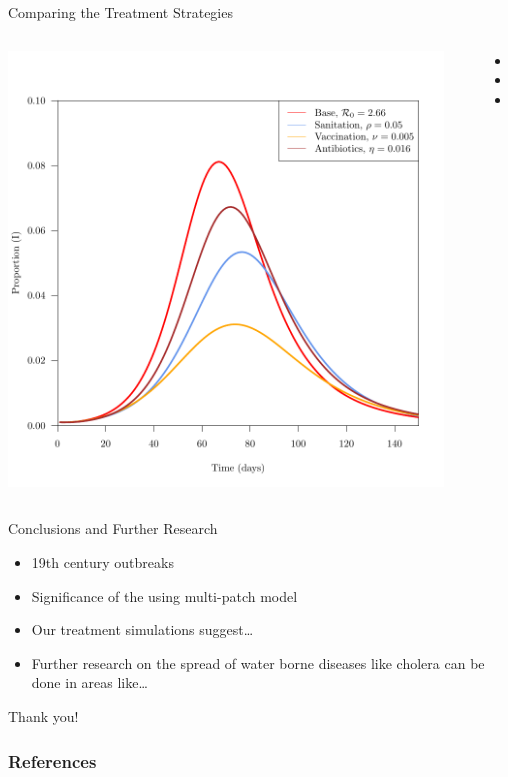 \documentclass{beamer}\usepackage[]{graphicx}\usepackage[]{color}
\begin{document}
\begin{frame}{Comparing the Treatment Strategies}
\begin{columns}[onlytextwidth]
\includegraphics[width=0.95\textwidth]{images/treatcomparison.pdf}
\begin{itemize}
\setlength\itemsep{2em}
\item 
\item 
\item 
\end{itemize}
\end{columns}
\end{frame}

\begin{frame}{Conclusions and Further Research}
\begin{itemize}
\setlength\itemsep{2em}
\item 19th century outbreaks
\item Significance of the using multi-patch model
\item Our treatment simulations suggest…
\item Further research on the spread of water borne diseases like cholera can be done in areas like… 
\end{itemize}
\end{frame}

\begin{frame}
\begin{center}
{\huge Thank you!}
\end{center}
\end{frame}

\begin{frame}[allowframebreaks]
        \frametitle{References}
        \nocite{*}
        
        
\end{frame}
\end{document}
